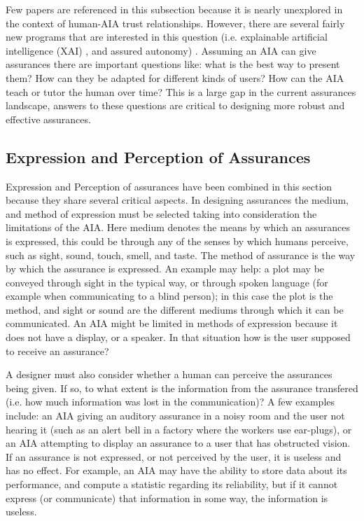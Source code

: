     Few papers are referenced in this subsection because it is nearly unexplored in the context of human-AIA trust relationships. However, there are several fairly new programs that are interested in this question (i.e. explainable artificial intelligence (XAI) \cite{Gunning2017-ih}, and assured autonomy) . Assuming an AIA can give assurances there are important questions like: what is the best way to present them? How can they be adapted for different kinds of users? How can the AIA teach or tutor the human over time? This is a large gap in the current assurances landscape, answers to these questions are critical to designing more robust and effective assurances.

\subsection{Expression and Perception of Assurances} \label{sec:express_assurances}
    Expression and Perception of assurances have been combined in this section because they share several critical aspects. In designing assurances the medium, and method of expression must be selected taking into consideration the limitations of the AIA. Here medium denotes the means by which an assurances is expressed, this could be through any of the senses by which humans perceive, such as sight, sound, touch, smell, and taste. The method of assurance is the way by which the assurance is expressed. An example may help: a plot may be conveyed through sight in the typical way, or through spoken language (for example when communicating to a blind person); in this case the plot is the method, and sight or sound are the different mediums through which it can be communicated. An AIA might be limited in methods of expression because it does not have a display, or a speaker. In that situation how is the user supposed to receive an assurance?

    A designer must also consider whether a human can perceive the assurances being given. If so, to what extent is the information from the assurance transfered (i.e. how much information was lost in the communication)? A few examples include: an AIA giving an auditory assurance in a noisy room and the user not hearing it (such as an alert bell in a factory where the workers use ear-plugs), or an AIA attempting to display an assurance to a user that has obstructed vision. If an assurance is not expressed, or not perceived by the user, it is useless and has no effect. For example, an AIA may have the ability to store data about its performance, and compute a statistic regarding its reliability, but if it cannot express (or communicate) that information in some way, the information is useless.

